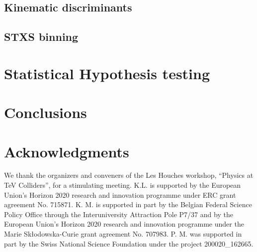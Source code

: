 \documentclass[11pt]{cernrep}
\begin{document}
\subsection{Kinematic discriminants}
\label{sec:training}


\subsection{STXS binning}
\label{sec:stxs}

\section{Statistical Hypothesis testing}
\label{sec:test}



\section{Conclusions}
\label{sec:conclusions}




\section*{Acknowledgments}

We thank the organizers and conveners of the Les Houches workshop, ``Physics
at TeV Colliders'', for a stimulating meeting. K.L. is supported by the European Union's
Horizon 2020 research and innovation programme under ERC grant agreement
No. 715871. K. M. is supported in part by the Belgian Federal Science Policy Office
through the Interuniversity Attraction Pole P7/37 and by the European Union’s Horizon 2020
research and innovation programme under the Marie Sk\l{}odowska-Curie grant agreement
No. 707983. 
P. M. was supported in part by the Swiss National Science Foundation under the project
200020\_162665.






%
\end{document}

